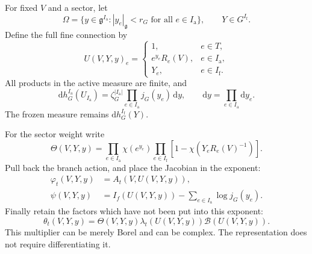 \documentclass[11pt,reqno]{amsart}
\numberwithin{equation}{section}
\theoremstyle{definition}
\theoremstyle{remark}
\newcommand{\dd}{\mathrm d}
\newcommand{\g}{\mathfrak g}
\newcommand{\Ia}{I_{\mathrm a}}
\newcommand{\If}{I_{\mathrm f}}
\begin{document}
For fixed \(V\) and a sector, let
\begin{equation}
 \Omega=\{y\in\g^{\Ia}:|y_e|_{\g}<r_G\text{ for all }e\in\Ia\},
 \qquad Y\in G^{\If}.
 \label{eq:chart-domain}
\end{equation}
Define the full fine connection by
\begin{equation}
 U(V,Y,y)_e=
 \begin{cases}
  1,&e\in T,\\
  e^{y_e}R_e(V),&e\in\Ia,\\
  Y_e,&e\in\If.
 \end{cases}
 \label{eq:sector-connection}
\end{equation}
All products in the active measure are finite, and
\begin{equation}
      \dd h_G^{\Ia}(U_{\Ia})
         =\zeta_G^{|\Ia|}\prod_{e\in\Ia}j_G(y_e)\,\dd y,
      \qquad \dd y=\prod_{e\in\Ia}\dd y_e.
 \label{eq:product-haar}
\end{equation}
The frozen measure remains \(\dd h_G^{\If}(Y)\).

For the sector weight write
\begin{equation}
 \Theta(V,Y,y)=\prod_{e\in\Ia}\chi(e^{y_e})
          \prod_{e\in\If}[1-\chi(Y_eR_e(V)^{-1})].
 \label{eq:sector-weight}
\end{equation}
Pull back the branch action, and place the Jacobian in the exponent:
\begin{align}
 \varphi_t(V,Y,y)&=A_t(V,U(V,Y,y)),\label{eq:sector-action}\\
 \psi(V,Y,y)&=I_f(U(V,Y,y))
                              -\sum_{e\in\Ia}\log j_G(y_e).
                              \label{eq:haar-correction}
\end{align}
Finally retain the factors which have not been put into this exponent:
\begin{equation}
 \theta_t(V,Y,y)=\Theta(V,Y,y)\lambda_t(U(V,Y,y))
                                      \mathcal B(U(V,Y,y)).
 \label{eq:full-sector-multiplier}
\end{equation}
This multiplier can be merely Borel and can be complex. The
representation does not require differentiating it.
\end{document}
